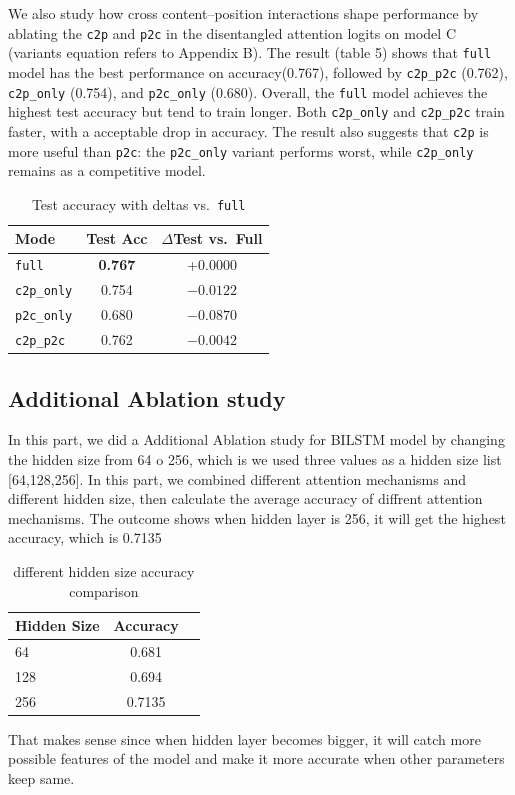 \documentclass[11pt]{article}
\begin{document}
We also study how cross content--position interactions shape performance by ablating the \texttt{c2p} and \texttt{p2c} in the disentangled attention logits on model C (variants equation refers to Appendix B).
The result (table 5) shows that \texttt{full} model has the best performance on accuracy(0.767), followed by \texttt{c2p\_p2c} (0.762), \texttt{c2p\_only} (0.754), and \texttt{p2c\_only} (0.680). 
Overall, the \texttt{full} model achieves the highest test accuracy but tend to train longer.
Both \texttt{c2p\_only} and \texttt{c2p\_p2c} train faster, with a acceptable drop in accuracy.
The result also suggests that \texttt{c2p} is more useful than \texttt{p2c}: the \texttt{p2c\_only}
variant performs worst, while \texttt{c2p\_only} remains as a competitive model.
\FloatBarrier
\begin{table}[H]
\centering
\caption{Test accuracy with deltas vs.\ \texttt{full}}
\label{tab:attn-ablation-acc}
\begingroup
\footnotesize                 %
\setlength{\tabcolsep}{4pt}   %
\renewcommand{\arraystretch}{0.95} %
\begin{tabular}{lcc}
\toprule
Mode & Test Acc & $\Delta$Test vs.\ Full \\
\midrule
\texttt{full}      & \textbf{0.767} & +0.0000 \\
\texttt{c2p\_only} & 0.754          & $-0.0122$ \\
\texttt{p2c\_only} & 0.680          & $-0.0870$ \\
\texttt{c2p\_p2c}  & 0.762          & $-0.0042$ \\
\bottomrule
\end{tabular}
\endgroup
\end{table}
\FloatBarrier

\subsection {Additional Ablation study}
In this part, we did a Additional Ablation study for BILSTM model by changing the hidden size from 64 o 256, which is we used three values as a hidden size list [64,128,256]. In this part, we combined different attention mechanisms and different hidden size, then calculate the average accuracy of diffrent attention mechanisms. The outcome shows when hidden layer is 256, it will get the highest accuracy, which is 0.7135
\begin{table}[H]
  \centering
  \begin{tabular}{lcc}
    \hline
    \textbf{Hidden Size} & \textbf{Accuracy}  \\
    \hline
    64 & 0.681  \\
    128 & 0.694  \\
    256 & 0.7135  \\
    \hline
  \end{tabular}
  \hfill
  \caption{different hidden size accuracy comparison}
  \label{tab:dataset_stats}
\end{table}
That makes sense since when hidden layer becomes bigger, it will catch more possible features of the model and make it more accurate when other parameters keep same.
\end{document}
